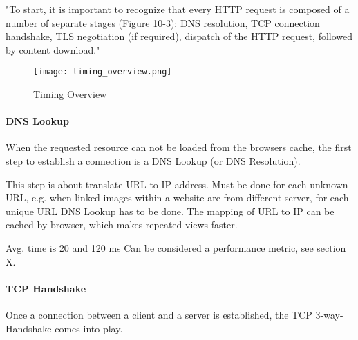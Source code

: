 "To start, it is important to recognize that every HTTP request is composed of a number of separate stages (Figure 10-3): DNS resolution, TCP connection handshake, TLS negotiation (if required), dispatch of the HTTP request, followed by content download." %


\begin{figure}[h!]
\begin{center}
\texttt{[image: timing\_overview.png]}
\caption{Timing Overview}
\label{img:timing_overview}
\end{center}
\end{figure}







\paragraph{DNS Lookup}

When the requested resource can not be loaded from the browsers cache, the first step to establish a connection is a DNS Lookup (or DNS Resolution).

This step is about translate URL to IP address.
Must be done for each unknown URL, e.g. when linked images within a website are from different server, for each unique URL DNS Lookup has to be done.
The mapping of URL to IP can be cached by browser, which makes repeated views faster. %

Avg. time is 20 and 120 ms %
Can be considered a performance metric, see section X.




\paragraph{TCP Handshake}

Once a connection between a client and a server is established, the TCP 3-way-Handshake comes into play.

